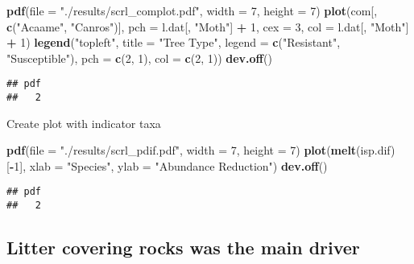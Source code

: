 \documentclass[]{article}
\newenvironment{Shaded}{\begin{snugshade}}{\end{snugshade}}
\newcommand{\KeywordTok}[1]{\textcolor[rgb]{0.13,0.29,0.53}{\textbf{#1}}}
\newcommand{\DataTypeTok}[1]{\textcolor[rgb]{0.13,0.29,0.53}{#1}}
\newcommand{\DecValTok}[1]{\textcolor[rgb]{0.00,0.00,0.81}{#1}}
\newcommand{\StringTok}[1]{\textcolor[rgb]{0.31,0.60,0.02}{#1}}
\newcommand{\OperatorTok}[1]{\textcolor[rgb]{0.81,0.36,0.00}{\textbf{#1}}}
\newcommand{\NormalTok}[1]{#1}
\begin{document}
\begin{Shaded}
\begin{Highlighting}[]
\KeywordTok{pdf}\NormalTok{(}\DataTypeTok{file =} \StringTok{"./results/scrl_complot.pdf"}\NormalTok{, }\DataTypeTok{width =} \DecValTok{7}\NormalTok{, }\DataTypeTok{height =} \DecValTok{7}\NormalTok{)}
\KeywordTok{plot}\NormalTok{(com[, }\KeywordTok{c}\NormalTok{(}\StringTok{"Acaame"}\NormalTok{, }\StringTok{"Canros"}\NormalTok{)], }\DataTypeTok{pch =}\NormalTok{ l.dat[, }\StringTok{"Moth"}\NormalTok{] }\OperatorTok{+}\StringTok{ }\DecValTok{1}\NormalTok{, }\DataTypeTok{cex =} \DecValTok{3}\NormalTok{, }\DataTypeTok{col =}\NormalTok{ l.dat[, }\StringTok{"Moth"}\NormalTok{] }\OperatorTok{+}\StringTok{ }\DecValTok{1}\NormalTok{)}
\KeywordTok{legend}\NormalTok{(}\StringTok{"topleft"}\NormalTok{, }\DataTypeTok{title =} \StringTok{"Tree Type"}\NormalTok{, }\DataTypeTok{legend =} \KeywordTok{c}\NormalTok{(}\StringTok{"Resistant"}\NormalTok{, }\StringTok{"Susceptible"}\NormalTok{), }\DataTypeTok{pch =} \KeywordTok{c}\NormalTok{(}\DecValTok{2}\NormalTok{, }\DecValTok{1}\NormalTok{), }\DataTypeTok{col =} \KeywordTok{c}\NormalTok{(}\DecValTok{2}\NormalTok{, }\DecValTok{1}\NormalTok{))}
\KeywordTok{dev.off}\NormalTok{()}
\end{Highlighting}
\end{Shaded}

\begin{verbatim}
## pdf 
##   2
\end{verbatim}

Create plot with indicator taxa

\begin{Shaded}
\begin{Highlighting}[]
\KeywordTok{pdf}\NormalTok{(}\DataTypeTok{file =} \StringTok{"./results/scrl_pdif.pdf"}\NormalTok{, }\DataTypeTok{width =} \DecValTok{7}\NormalTok{, }\DataTypeTok{height =} \DecValTok{7}\NormalTok{)}
\KeywordTok{plot}\NormalTok{(}\KeywordTok{melt}\NormalTok{(isp.dif)[}\OperatorTok{-}\DecValTok{1}\NormalTok{], }\DataTypeTok{xlab =} \StringTok{"Species"}\NormalTok{, }\DataTypeTok{ylab =} \StringTok{"Abundance Reduction"}\NormalTok{)}
\KeywordTok{dev.off}\NormalTok{()}
\end{Highlighting}
\end{Shaded}

\begin{verbatim}
## pdf 
##   2
\end{verbatim}

\subsection{Litter covering rocks was the main
driver}\label{litter-covering-rocks-was-the-main-driver}
\end{document}
